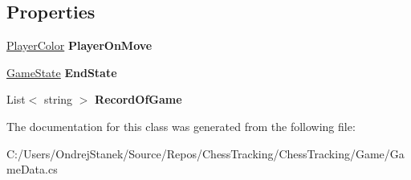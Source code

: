 \subsection*{Properties}
\begin{DoxyCompactItemize}
\item 
\mbox{\label{class_chess_tracking_1_1_game_1_1_game_data_a54b6fe5fd1a3a71075d3beba356b75a8}} 
\mbox{\hyperlink{namespace_chess_tracking_1_1_game_ab79070a55977a8c8326e9cdda7dcfa9a}{Player\+Color}} {\bfseries Player\+On\+Move}
\item 
\mbox{\label{class_chess_tracking_1_1_game_1_1_game_data_ae89003ad1f51e916bd7820ebf34550ca}} 
\mbox{\hyperlink{namespace_chess_tracking_1_1_game_acd441ca4d0791bf4bf7fa8ec204a1ed7}{Game\+State}} {\bfseries End\+State}
\item 
\mbox{\label{class_chess_tracking_1_1_game_1_1_game_data_ad38922627b52e2e1f51e2ae5d345ebe5}} 
List$<$ string $>$ {\bfseries Record\+Of\+Game}
\end{DoxyCompactItemize}


The documentation for this class was generated from the following file\+:\begin{DoxyCompactItemize}
\item 
C\+:/\+Users/\+Ondrej\+Stanek/\+Source/\+Repos/\+Chess\+Tracking/\+Chess\+Tracking/\+Game/Game\+Data.\+cs\end{DoxyCompactItemize}
